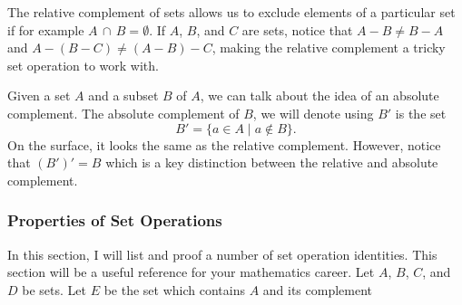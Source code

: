 \documentclass[12pt]{book}
\begin{document}
The relative complement of sets allows us to exclude elements of a particular set if for example $A\,\cap\,B=\emptyset$. If $A$, $B$, and $C$ are sets, notice that $A-B\neq B-A$ and $A-(B-C)\neq (A-B)-C$, making the relative complement a tricky set operation to work with. 

Given a set $A$ and a subset $B$ of $A$, we can talk about the idea of an absolute complement. The absolute complement of $B$, we will denote using $B'$ is the set 
\[B'=\{a\in A\mid a\notin B\}.\]
On the surface, it looks the same as the relative complement. However, notice that $(B')'=B$ which is a key distinction between the relative and absolute complement.

\subsubsection{Properties of Set Operations}

In this section, I will list and proof a number of set operation identities. This section will be a useful reference for your mathematics career. Let $A$, $B$, $C$, and $D$ be sets. Let $E$ be the set which contains $A$ and its complement\\
\end{document}
